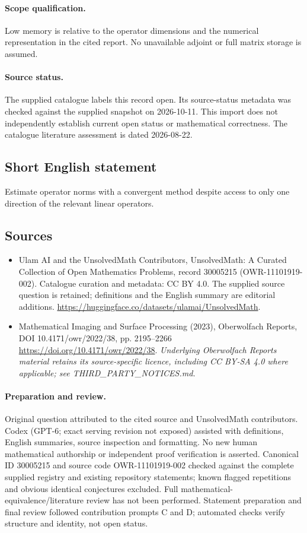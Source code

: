 \documentclass[11pt]{article}
\begin{document}
\paragraph{Scope qualification.}
Low memory is relative to the operator dimensions and the numerical representation in the cited report. No unavailable adjoint or full matrix storage is assumed.
\paragraph{Source status.}
The supplied catalogue labels this record open. Its source-status metadata was checked against the supplied snapshot on 2026-10-11. This import does not independently establish current open status or mathematical correctness. The catalogue literature assessment is dated 2026-08-22.
\subsection{Short English statement}
Estimate operator norms with a convergent method despite access to only one direction of the relevant linear operators.
\subsection{Sources}
\begin{itemize}
\item[S1] Ulam AI and the UnsolvedMath Contributors, UnsolvedMath: A Curated Collection of Open Mathematics Problems, record 30005215 (OWR-11101919-002). Catalogue curation and metadata: CC BY 4.0. The supplied source question is retained; definitions and the English summary are editorial additions.
\url{https://huggingface.co/datasets/ulamai/UnsolvedMath}.
\item[S2] Mathematical Imaging and Surface Processing (2023), Oberwolfach Reports, DOI 10.4171/owr/2022/38, pp. 2195--2266
\url{https://doi.org/10.4171/owr/2022/38}.
\textit{Underlying Oberwolfach Reports material retains its source-specific licence, including CC BY-SA 4.0 where applicable; see THIRD\_PARTY\_NOTICES.md.}
\end{itemize}
\paragraph{Preparation and review.}
Original question attributed to the cited source and UnsolvedMath contributors. Codex (GPT-6; exact serving revision not exposed) assisted with definitions, English summaries, source inspection and formatting. No new human mathematical authorship or independent proof verification is asserted. Canonical ID 30005215 and source code OWR-11101919-002 checked against the complete supplied registry and existing repository statements; known flagged repetitions and obvious identical conjectures excluded. Full mathematical-equivalence/literature review has not been performed. Statement preparation and final review followed contribution prompts C and D; automated checks verify structure and identity, not open status.
\label{end:30005215}
\end{document}
